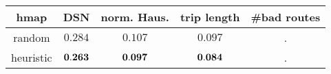 \documentclass{article}
\begin{document}
\begin{tabular} {c || c | c | c | c}
    hmap & DSN & norm. Haus. & trip length & #bad routes \\ \hline
    random &  \(0.284\) & \(0.107\) & \(0.097\) & . \\
    heuristic & \(\bf{0.263}\) & \(\bf{0.097}\) & \(\bf{0.084}\) &. \\
\end{tabular}
\end{document}
